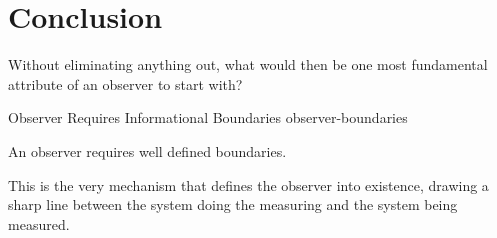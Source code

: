 \section{Conclusion}

Without eliminating anything out, what would then be one most fundamental
attribute of an observer to start with?

\begin{principle}{Observer Requires Informational Boundaries}
{observer-boundaries}

An observer requires well defined boundaries.

\end{principle}

This is the very mechanism that defines the observer into existence, drawing a sharp line between the system doing the measuring and the system being measured.

